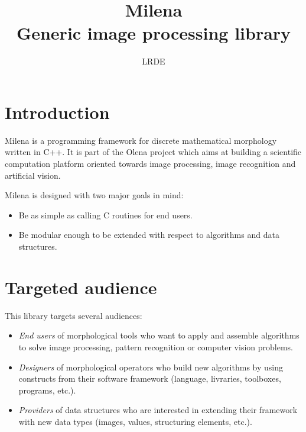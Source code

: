 \documentclass{article}
\title{Milena\\
  \large{Generic image processing library} }
\author{LRDE}
\date{}
\begin{document}
\maketitle

\section{Introduction}
Milena is a programming framework for discrete mathematical morphology written
in C++. It is part of the Olena project which aims at building a scientific
computation platform oriented towards image processing, image recognition and
artificial vision.

Milena is designed with two major goals in mind:
\begin{itemize}
  \item Be as simple as calling C routines for end users.
  \item Be modular enough to be extended with respect to algorithms and data
	structures.
\end{itemize}


\section{Targeted audience}
This library targets several audiences:
\begin{itemize}

  \item \textit{End users} of morphological tools who want to apply and assemble
  algorithms to solve image processing, pattern recognition or computer vision
  problems.
  \item \textit{Designers} of morphological operators who build new algorithms
  by using constructs from their software framework (language, livraries,
      toolboxes, programs, etc.).
  \item \textit{Providers} of data structures who are interested in extending
  their framework with new data types (images, values, structuring elements,
      etc.).

\end{itemize}

\end{document}
